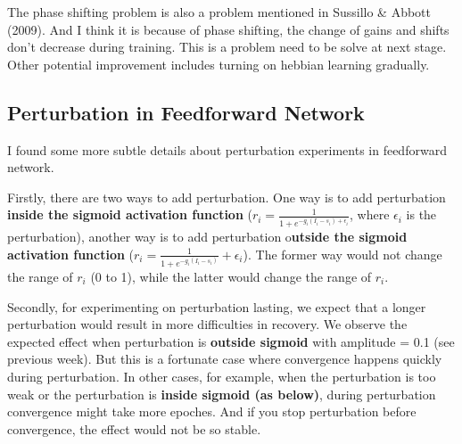 \documentclass[12pt, a4paper]{article}
\begin{document}
The phase shifting problem is also a problem mentioned in Sussillo \& Abbott (2009). And I think it is because of phase shifting, the change of gains and shifts don't decrease during training. This is a problem need to be solve at next stage. Other potential improvement includes turning on hebbian learning gradually.

\newpage

\subsection*{Perturbation in Feedforward Network}

I found some more subtle details about perturbation experiments in feedforward network.

Firstly, there are two ways to add perturbation. One way is to add perturbation \textbf{inside the sigmoid activation function} ($r_i = \frac{1}{1 + e^{-g_i(I_i-s_i) + \epsilon_i}}$, where $\epsilon_i$ is the perturbation), another way is to add perturbation o\textbf{utside the sigmoid activation function} ($r_i = \frac{1}{1 + e^{-g_i(I_i-s_i)}} + \epsilon_i$). The former way would not change the range of $r_i$ (0 to 1), while the latter would change the range of $r_i$.

Secondly, for experimenting on perturbation lasting, we expect that a longer perturbation would result in more difficulties in recovery. We observe the expected effect when perturbation is \textbf{outside sigmoid} with amplitude = 0.1 (see previous week). But this is a fortunate case where convergence happens quickly during perturbation. In other cases, for example, when the perturbation is too weak or the perturbation is \textbf{inside sigmoid (as below)}, during perturbation convergence might take more epoches. And if you stop perturbation before convergence, the effect would not be so stable.
\end{document}
